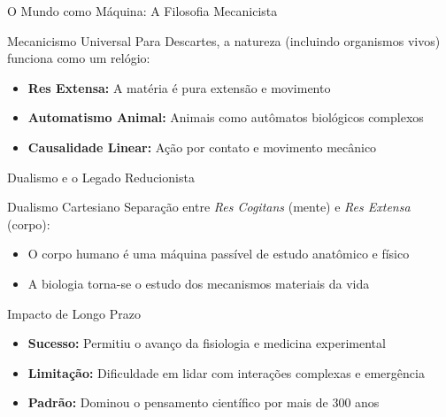\begin{frame}{O Mundo como Máquina: A Filosofia Mecanicista}
\begin{block}{Mecanicismo Universal}
Para Descartes, a natureza (incluindo organismos vivos) funciona como um relógio:
\begin{itemize}
    \item \textbf{Res Extensa:} A matéria é pura extensão e movimento
    \item \textbf{Automatismo Animal:} Animais como autômatos biológicos complexos
    \item \textbf{Causalidade Linear:} Ação por contato e movimento mecânico
\end{itemize}
\end{block}

\vspace{0.3cm}

\end{frame}

\begin{frame}{Dualismo e o Legado Reducionista}
\begin{block}{Dualismo Cartesiano}
Separação entre \textit{Res Cogitans} (mente) e \textit{Res Extensa} (corpo):
\begin{itemize}
    \item O corpo humano é uma máquina passível de estudo anatômico e físico
    \item A biologia torna-se o estudo dos mecanismos materiais da vida
\end{itemize}
\end{block}

\vspace{0.3cm}

\begin{exampleblock}{Impacto de Longo Prazo}
\begin{itemize}
    \item \textbf{Sucesso:} Permitiu o avanço da fisiologia e medicina experimental
    \item \textbf{Limitação:} Dificuldade em lidar com interações complexas e emergência
    \item \textbf{Padrão:} Dominou o pensamento científico por mais de 300 anos
\end{itemize}
\end{exampleblock}
\end{frame}

